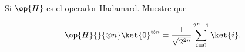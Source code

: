 \documentclass[./../main.tex]{subfiles}
\begin{document}
    \section{}

    Si \(\op{H}\) es el operador Hadamard. Muestre que

    \begin{equation*}
        \op{H}{}{\otimes n}\ket{0}^{\otimes n} = \dfrac{1}{\sqrt{2^{2n}}}\sum_{i = 0}^{2^{n} - 1}\ket{i}.
    \end{equation*}
\end{document}

